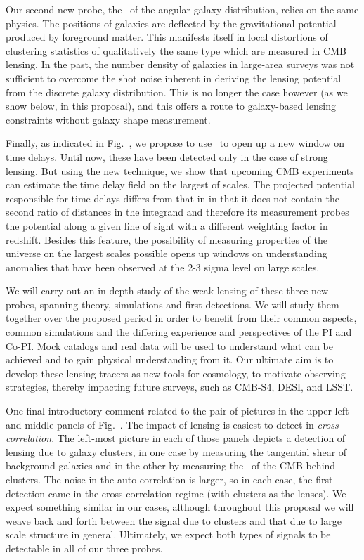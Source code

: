 Our second new probe, the \atf\ 
of the angular galaxy distribution,
relies on the same physics. The positions
of galaxies are deflected by the gravitational potential produced by
foreground matter. This manifests itself in local distortions of
clustering statistics of qualitatively 
the same type which are measured in CMB lensing.
In the past, the number density of galaxies in large-area surveys 
was not sufficient to overcome the shot noise inherent in deriving
the lensing potential from the discrete galaxy distribution. This is
no longer the case however (as we show below, in this proposal), and
this offers a route to galaxy-based lensing constraints without
galaxy shape measurement.

Finally, as indicated in Fig.~, we propose to use \atf\ to open up a new window on time delays. Until now, these have been detected only in the case of strong lensing. But using the new technique, we show that upcoming CMB experiments can estimate the time delay field on the largest of scales. The projected potential responsible for time delays differs from that in  in that it does not contain the second ratio of distances in the integrand and therefore its measurement probes the potential along a given line of sight with a different weighting factor in redshift. Besides this feature, the possibility of measuring properties of the universe on the largest scales possible opens up windows on understanding anomalies that have been observed at the 2-3 sigma level on large scales. 

We will carry out an in depth study of 
the weak lensing of these three new probes, spanning theory, 
simulations and first detections. 
We will study them together over the proposed period in order to benefit from
their common aspects, common
simulations and
the differing experience and perspectives of the PI and Co-PI.
Mock catalogs and  real data will be used to understand what can be achieved and to gain physical understanding
from it. Our ultimate aim is to develop these lensing tracers as new tools
for cosmology, to motivate 
observing strategies, thereby impacting future surveys, such as CMB-S4, DESI, and LSST. 

One final introductory comment related to the pair of pictures in the upper left and middle panels of Fig.~. The impact of lensing is easiest to detect in {\it cross-correlation}. The left-most picture in each of those panels depicts a detection of lensing due to galaxy clusters, in one case by measuring the tangential shear of background galaxies and in the other by measuring the \atf\ of the CMB behind clusters. The noise in the auto-correlation is larger, so in each case, the first detection came in the cross-correlation regime (with clusters as the lenses). We expect something similar in our cases, although throughout this proposal we will weave back and forth between the signal due to clusters and that due to large scale structure in general. Ultimately, we expect both types of signals to be detectable in all of our three  probes.

